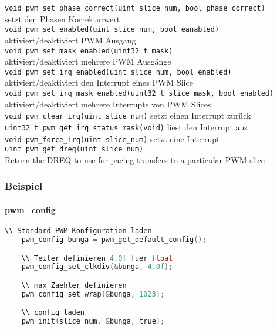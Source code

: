 \documentclass[a4paper,12pt,twoside]{article}
\begin{document}
\begin{tabbing}
	\> \verb|void pwm_set_phase_correct(uint slice_num, bool phase_correct)| \\
	\>  \hspace{2mm} setzt den Phasen Korrekturwert \\
	\> \verb|void pwm_set_enabled(uint slice_num, bool eanabled)| \\
	\>  \hspace{2mm} aktiviert/deaktiviert PWM Ausgang \\
	\> \verb|void pwm_set_mask_enabled(uint32_t mask)| \\
	\>  \hspace{2mm} aktiviert/deaktiviert mehrere PWM Ausgänge \\
	\> \verb|void pwm_set_irq_enabled(uint slice_num, bool enabled)| \\
	\>  \hspace{2mm} aktiviert/deaktiviert den Interrupt eines PWM Slice \\
	\> \verb|void pwm_set_irq_mask_enabled(uint32_t slice_mask, bool enabled)| \\
	\>  \hspace{2mm} aktiviert/deaktiviert mehrere Interrupts von PWM Slices \\
	\> \verb|void pwm_clear_irq(uint slice_num)| \> setzt einen Interrupt zurück \\
	\> \verb|uint32_t pwm_get_irq_status_mask(void)| \> liest den Interrupt aus \\
	\> \verb|void pwm_force_irq(uint slice_num)| \> setzt eine Interrupt \\
	\> \verb|uint pwm_get_dreq(uint slice_num)| \\
	\>  \hspace{2mm} Return the DREQ to use for pacing transfers to a particular PWM slice \\
\end{tabbing}
\subsubsection{Beispiel}
		\paragraph{pwm\_config}
\begin{center}
	\begin{minipage}{1.0\textwidth}
		\begin{lstlisting}[language=C]
    \\ Standard PWM Konfiguration laden
    pwm_config bunga = pwm_get_default_config();

    \\ Teiler definieren 4.0f fuer float
    pwm_config_set_clkdiv(&bunga, 4.0f);

    \\ max Zaehler definieren
    pwm_config_set_wrap(&bunga, 1023);

    \\ config laden
    pwm_init(slice_num, &bunga, true);
    \end{lstlisting}
	\end{minipage}
\end{center}
\end{document}
